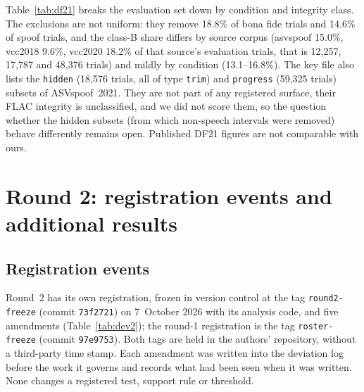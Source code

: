 \documentclass[10pt]{article}
\newcommand{\wide}[1]{\begingroup\footnotesize\setlength{\tabcolsep}{3.5pt}\resizebox{\textwidth}{!}{}\endgroup}
\begin{document}
Table~\ref{tab:df21} breaks the evaluation set down by condition and integrity class. The exclusions are not uniform: they remove 18.8\% of bona
fide trials and 14.6\% of spoof trials, and the class-B share differs by source corpus (asvspoof 15.0\%, vcc2018 9.6\%, vcc2020 18.2\%
of that source's evaluation trials, that is 12,257, 17,787 and 48,376 trials) and mildly by condition (13.1--16.8\%). The key file also lists the
\texttt{hidden} (18,576 trials, all of type \texttt{trim}) and \texttt{progress} (59,325 trials) subsets of ASVspoof~2021. They are not part of any
registered surface, their FLAC integrity is unclassified, and we did not score them, so the question whether the hidden subsets (from which
non-speech intervals were removed) behave differently remains open. Published DF21 figures are not comparable with ours.

\begin{table}[!ht]
\caption{DF21 evaluation trials by media condition and FLAC integrity class: class A (libFLAC 1.4 rejects the file, 1.3 decodes it and the MD5
verifies), class B (MD5 fails), the verified subset (evaluation minus B) and the clean subset (evaluation minus A and B).}
\label{tab:df21}
\centering
\wide{s_tab_df21}
\end{table}

\section{Round 2: registration events and additional results}
\label{sec:r2supp}
\subsection{Registration events}
Round~2 has its own registration, frozen in version control at the tag \texttt{round2-freeze} (commit \texttt{73f2721})
on 7~October 2026 with its analysis code, and five amendments (Table~\ref{tab:dev2}); the round-1 registration is the tag
\texttt{roster-freeze} (commit \texttt{97e9753}). Both tags are held in the authors' repository, without a third-party
time stamp. Each amendment was written into the deviation log before
the work it governs and records what had been seen when it was written. None changes a registered test, support rule or
threshold.
\end{document}

